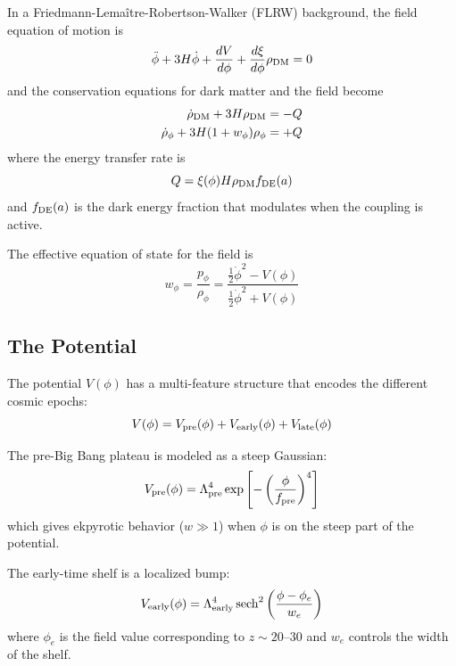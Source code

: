\documentclass[twocolumn,showpacs,preprintnumbers,amsmath,amssymb,prd]{revtex4-2}
\begin{document}
In a Friedmann-Lema\^itre-Robertson-Walker (FLRW) background, the field equation of motion is
\begin{equation}
\ddot{\phi} + 3H\dot{\phi} + \frac{dV}{d\phi} + \frac{d\xi}{d\phi}\rho_{\rm DM} = 0
\end{equation}
and the conservation equations for dark matter and the field become
\begin{align}
\dot{\rho}_{\rm DM} + 3H\rho_{\rm DM} &= -Q \\
\dot{\rho}_\phi + 3H(1+w_\phi)\rho_\phi &= +Q
\end{align}
where the energy transfer rate is
\begin{equation}
Q = \xi(\phi) H \rho_{\rm DM} f_{\rm DE}(a)
\end{equation}
and $f_{\rm DE}(a)$ is the dark energy fraction that modulates when the coupling is active.

The effective equation of state for the field is
\begin{equation}
w_\phi = \frac{p_\phi}{\rho_\phi} = \frac{\frac{1}{2}\dot{\phi}^2 - V(\phi)}{\frac{1}{2}\dot{\phi}^2 + V(\phi)}
\end{equation}

\subsection{The Potential}

The potential $V(\phi)$ has a multi-feature structure that encodes the different cosmic epochs:
\begin{equation}
V(\phi) = V_{\rm pre}(\phi) + V_{\rm early}(\phi) + V_{\rm late}(\phi)
\label{eq:potential}
\end{equation}

The pre-Big Bang plateau is modeled as a steep Gaussian:
\begin{equation}
V_{\rm pre}(\phi) = \Lambda_{\rm pre}^4 \exp\left[-\left(\frac{\phi}{f_{\rm pre}}\right)^4\right]
\end{equation}
which gives ekpyrotic behavior ($w \gg 1$) when $\phi$ is on the steep part of the potential.

The early-time shelf is a localized bump:
\begin{equation}
V_{\rm early}(\phi) = \Lambda_{\rm early}^4 \,{\rm sech}^2\left(\frac{\phi - \phi_e}{w_e}\right)
\end{equation}
where $\phi_e$ is the field value corresponding to $z \sim 20$--$30$ and $w_e$ controls the width of the shelf.
\end{document}
